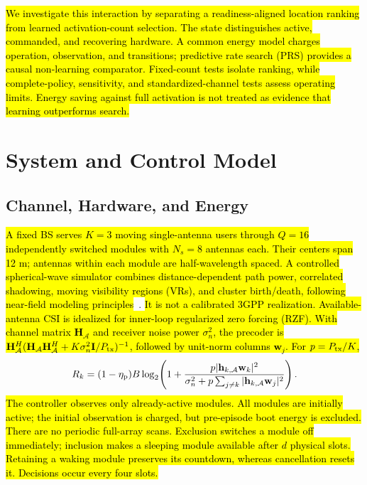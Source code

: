 \documentclass[letterpaper,conference]{IEEEtran}
\newcommand{\rev}[1]{\hl{#1}}
\newcommand{\rev}[1]{\hl{#1}}
\begin{document}
\rev{We investigate this interaction by separating a readiness-aligned location ranking from learned activation-count selection. The state distinguishes active, commanded, and recovering hardware. A common energy model charges operation, observation, and transitions; predictive rate search (PRS) provides a causal non-learning comparator. Fixed-count tests isolate ranking, while complete-policy, sensitivity, and standardized-channel tests assess operating limits. Energy saving against full activation is not treated as evidence that learning outperforms search.}

\section{System and Control Model}
\subsection{Channel, Hardware, and Energy}
\rev{A fixed BS serves $K=3$ moving single-antenna users through $Q=16$ independently switched modules with $N_s=8$ antennas each. Their centers span 12 m; antennas within each module are half-wavelength spaced. A controlled spherical-wave simulator combines distance-dependent path power, correlated shadowing, moving visibility regions (VRs), and cluster birth/death, following near-field modeling principles}~\cite{liu2023}. \rev{It is not a calibrated 3GPP realization. Available-antenna CSI is idealized for inner-loop regularized zero forcing (RZF). With channel matrix $\mathbf H_{\mathcal A}$ and receiver noise power $\sigma_n^2$, the precoder is $\mathbf H_{\mathcal A}^{H}(\mathbf H_{\mathcal A}\mathbf H_{\mathcal A}^{H}+K\sigma_n^2\mathbf I/P_{\rm tx})^{-1}$, followed by unit-norm columns $\mathbf w_j$. For $p=P_{\rm tx}/K$,}
\begin{equation}
R_k=(1-\eta_{\rm p})B\log_2\!\left(1+
\frac{p|\mathbf h_{k,\mathcal A}\mathbf w_k|^2}
{\sigma_n^2+p\sum_{j\ne k}|\mathbf h_{k,\mathcal A}\mathbf w_j|^2}\right).
\end{equation}
\rev{The controller observes only already-active modules. All modules are initially active; the initial observation is charged, but pre-episode boot energy is excluded. There are no periodic full-array scans. Exclusion switches a module off immediately; inclusion makes a sleeping module available after $d$ physical slots. Retaining a waking module preserves its countdown, whereas cancellation resets it. Decisions occur every four slots.}
\end{document}

